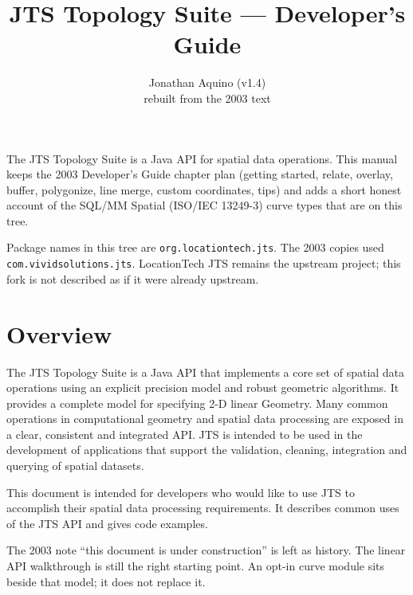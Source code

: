 \documentclass[11pt]{article}
\title{JTS Topology Suite --- Developer's Guide}
\author{Jonathan Aquino (v1.4) \\ rebuilt from the 2003 text}
\date{}
\begin{document}

\noindent
The JTS Topology Suite is a Java API for spatial data operations. This
manual keeps the 2003 Developer's Guide chapter plan (getting started,
relate, overlay, buffer, polygonize, line merge, custom coordinates,
tips) and adds a short honest account of the SQL/MM Spatial
(ISO/IEC 13249-3) curve types that are on this tree.

Package names in this tree are \texttt{org.locationtech.jts}. The 2003
copies used \texttt{com.vividsolutions.jts}. LocationTech JTS remains
the upstream project; this fork is not described as if it were already
upstream.

\clearpage
{}

\tableofcontents
\clearpage

\section{Overview}
The JTS Topology Suite is a Java API that implements a core set of
spatial data operations using an explicit precision model and robust
geometric algorithms. It provides a complete model for specifying 2-D
linear Geometry. Many common operations in computational geometry and
spatial data processing are exposed in a clear, consistent and
integrated API. JTS is intended to be used in the development of
applications that support the validation, cleaning, integration and
querying of spatial datasets.

This document is intended for developers who would like to use JTS to
accomplish their spatial data processing requirements. It describes
common uses of the JTS API and gives code examples.

The 2003 note ``this document is under construction'' is left as
history. The linear API walkthrough is still the right starting point.
An opt-in curve module sits beside that model; it does not replace it.
\end{document}
